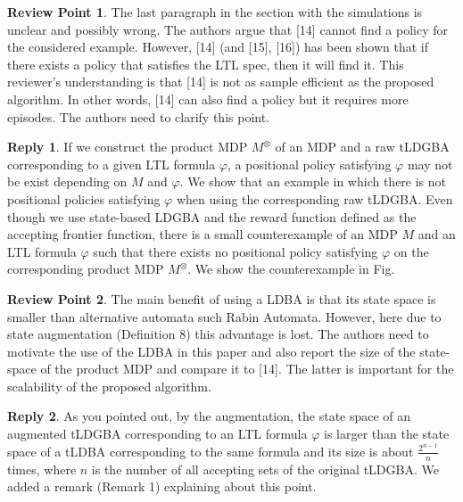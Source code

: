 \documentclass[10 pt, dvipdfmx]{article}
\theoremstyle{definition}
\newtheorem{review point}{Review Point}[section]
\newtheorem*{reply}{Reply}
\begin{document}
\begin{review point}
  The last paragraph in the section with the simulations is unclear
and possibly wrong. The authors argue that [14] cannot find a policy
for the considered example. However, [14] (and [15], [16]) has been
shown that if there exists a policy that satisfies the LTL spec, then
it will find it. This reviewer's understanding is that [14] is not as
sample efficient as the proposed algorithm. In other words, [14] can
also find a policy but it requires more episodes. The authors need to
clarify this point.
\end{review point}

\begin{reply}
  If we construct the product MDP $M^{\otimes}$ of an MDP and a raw tLDGBA corresponding to a given LTL formula $\varphi$, a positional policy satisfying $\varphi$ may not be exist depending on $M$ and $\varphi$. We show that an example in which there is not positional policies satisfying $\varphi$ when using the corresponding raw tLDGBA. Even though we use state-based LDGBA and the reward function defined as the accepting frontier function, there is a small counterexample of an MDP $M$ and an LTL formula $\varphi$ such that there exists no positional policy satisfying $\varphi$ on the corresponding product MDP $M^{\otimes}$. We show the counterexample in Fig.
\end{reply}

\begin{review point}
  The main benefit of using a LDBA is that its state space is smaller
than alternative automata such Rabin Automata. However, here due to
state augmentation (Definition 8) this advantage is lost. The authors
need to motivate the use of the LDBA in this paper and also report the
size of the state-space of the product MDP and compare it to [14]. The
latter is important for the scalability of the proposed algorithm.
\end{review point}

\begin{reply}
 As you pointed out, by the augmentation, the state space of an augmented tLDGBA corresponding to an LTL formula $\varphi$ is larger than the state space of a tLDBA corresponding to the same formula and its size is about $\frac{2^{n-1}}{n}$ times, where $n$ is the number of all accepting sets of the original tLDGBA. We added a remark (Remark 1) explaining about this point.
\end{reply}
\end{document}

